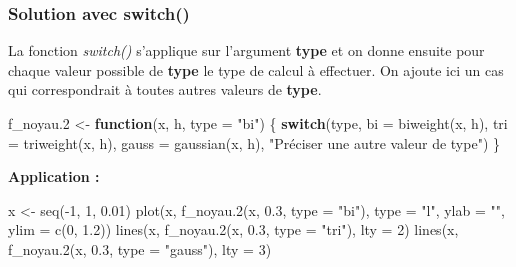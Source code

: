 \documentclass[
]{book}
\newenvironment{Shaded}{\begin{snugshade}}{\end{snugshade}}
\newcommand{\AttributeTok}[1]{\textcolor[rgb]{0.77,0.63,0.00}{#1}}
\newcommand{\ControlFlowTok}[1]{\textcolor[rgb]{0.13,0.29,0.53}{\textbf{#1}}}
\newcommand{\DecValTok}[1]{\textcolor[rgb]{0.00,0.00,0.81}{#1}}
\newcommand{\FloatTok}[1]{\textcolor[rgb]{0.00,0.00,0.81}{#1}}
\newcommand{\FunctionTok}[1]{\textcolor[rgb]{0.00,0.00,0.00}{#1}}
\newcommand{\NormalTok}[1]{#1}
\newcommand{\OtherTok}[1]{\textcolor[rgb]{0.56,0.35,0.01}{#1}}
\newcommand{\SpecialCharTok}[1]{\textcolor[rgb]{0.00,0.00,0.00}{#1}}
\newcommand{\StringTok}[1]{\textcolor[rgb]{0.31,0.60,0.02}{#1}}
\theoremstyle{definition}
\theoremstyle{definition}
\theoremstyle{definition}
\theoremstyle{definition}
\theoremstyle{remark}
\begin{document}
\hypertarget{solution-avec-switch}{%
\subsubsection{\texorpdfstring{Solution avec \textbf{switch()}}{Solution avec switch()}}\label{solution-avec-switch}}

La fonction \emph{switch()} s'applique sur l'argument \textbf{type} et on donne ensuite pour chaque valeur possible de \textbf{type} le type de calcul à effectuer. On ajoute ici un cas qui correspondrait à toutes autres valeurs de \textbf{type}.

\begin{Shaded}
\begin{Highlighting}[]
\NormalTok{f\_noyau}\FloatTok{.2} \OtherTok{\textless{}{-}} \ControlFlowTok{function}\NormalTok{(x, h, }\AttributeTok{type =} \StringTok{"bi"}\NormalTok{) \{}
  \ControlFlowTok{switch}\NormalTok{(type, }\AttributeTok{bi =} \FunctionTok{biweight}\NormalTok{(x, h),}
               \AttributeTok{tri =} \FunctionTok{triweight}\NormalTok{(x, h),}
               \AttributeTok{gauss =} \FunctionTok{gaussian}\NormalTok{(x, h),}
               \StringTok{"Préciser une autre valeur de type"}\NormalTok{)}
\NormalTok{\}}
\end{Highlighting}
\end{Shaded}

\textbf{Application :}

\begin{Shaded}
\begin{Highlighting}[]
\NormalTok{x }\OtherTok{\textless{}{-}} \FunctionTok{seq}\NormalTok{(}\SpecialCharTok{{-}}\DecValTok{1}\NormalTok{, }\DecValTok{1}\NormalTok{, }\FloatTok{0.01}\NormalTok{)}
\FunctionTok{plot}\NormalTok{(x, }\FunctionTok{f\_noyau.2}\NormalTok{(x, }\FloatTok{0.3}\NormalTok{, }\AttributeTok{type =} \StringTok{"bi"}\NormalTok{), }\AttributeTok{type =} \StringTok{"l"}\NormalTok{, }\AttributeTok{ylab =} \StringTok{""}\NormalTok{, }\AttributeTok{ylim =} \FunctionTok{c}\NormalTok{(}\DecValTok{0}\NormalTok{, }\FloatTok{1.2}\NormalTok{))}
\FunctionTok{lines}\NormalTok{(x, }\FunctionTok{f\_noyau.2}\NormalTok{(x, }\FloatTok{0.3}\NormalTok{, }\AttributeTok{type =} \StringTok{"tri"}\NormalTok{), }\AttributeTok{lty =} \DecValTok{2}\NormalTok{)}
\FunctionTok{lines}\NormalTok{(x, }\FunctionTok{f\_noyau.2}\NormalTok{(x, }\FloatTok{0.3}\NormalTok{, }\AttributeTok{type =} \StringTok{"gauss"}\NormalTok{), }\AttributeTok{lty =} \DecValTok{3}\NormalTok{)}
\end{Highlighting}
\end{Shaded}
\end{document}
